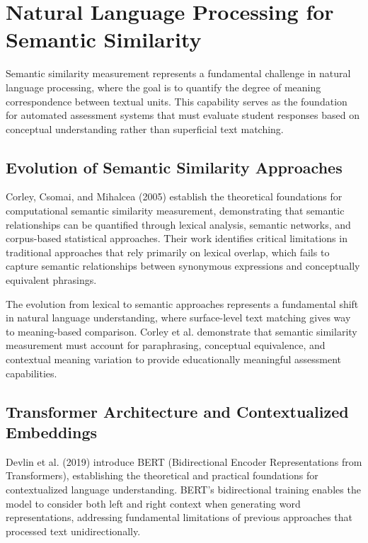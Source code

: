 {\color{maroon}
\section{Natural Language Processing for Semantic Similarity}

Semantic similarity measurement represents a fundamental challenge in natural language processing, where the goal is to quantify the degree of meaning correspondence between textual units. This capability serves as the foundation for automated assessment systems that must evaluate student responses based on conceptual understanding rather than superficial text matching.

\subsection{Evolution of Semantic Similarity Approaches}

Corley, Csomai, and Mihalcea (2005) establish the theoretical foundations for computational semantic similarity measurement, demonstrating that semantic relationships can be quantified through lexical analysis, semantic networks, and corpus-based statistical approaches. Their work identifies critical limitations in traditional approaches that rely primarily on lexical overlap, which fails to capture semantic relationships between synonymous expressions and conceptually equivalent phrasings.

The evolution from lexical to semantic approaches represents a fundamental shift in natural language understanding, where surface-level text matching gives way to meaning-based comparison. Corley et al. demonstrate that semantic similarity measurement must account for paraphrasing, conceptual equivalence, and contextual meaning variation to provide educationally meaningful assessment capabilities.

\subsection{Transformer Architecture and Contextualized Embeddings}

Devlin et al. (2019) introduce BERT (Bidirectional Encoder Representations from Transformers), establishing the theoretical and practical foundations for contextualized language understanding. BERT's bidirectional training enables the model to consider both left and right context when generating word representations, addressing fundamental limitations of previous approaches that processed text unidirectionally.

}
